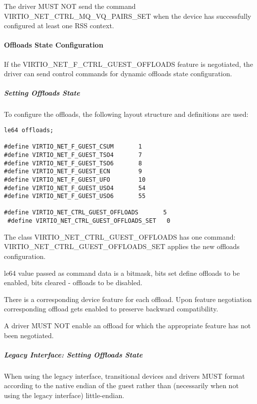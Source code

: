 The driver MUST NOT send the command VIRTIO_NET_CTRL_MQ_VQ_PAIRS_SET when the device has successfully configured at least one RSS context.

\paragraph{Offloads State Configuration}\label{sec:Device Types / Network Device / Device Operation / Control Virtqueue / Offloads State Configuration}

If the VIRTIO_NET_F_CTRL_GUEST_OFFLOADS feature is negotiated, the driver can
send control commands for dynamic offloads state configuration.

\subparagraph{Setting Offloads State}\label{sec:Device Types / Network Device / Device Operation / Control Virtqueue / Offloads State Configuration / Setting Offloads State}

To configure the offloads, the following layout structure and
definitions are used:

\begin{lstlisting}
le64 offloads;

#define VIRTIO_NET_F_GUEST_CSUM       1
#define VIRTIO_NET_F_GUEST_TSO4       7
#define VIRTIO_NET_F_GUEST_TSO6       8
#define VIRTIO_NET_F_GUEST_ECN        9
#define VIRTIO_NET_F_GUEST_UFO        10
#define VIRTIO_NET_F_GUEST_USO4       54
#define VIRTIO_NET_F_GUEST_USO6       55

#define VIRTIO_NET_CTRL_GUEST_OFFLOADS       5
 #define VIRTIO_NET_CTRL_GUEST_OFFLOADS_SET   0
\end{lstlisting}

The class VIRTIO_NET_CTRL_GUEST_OFFLOADS has one command:
VIRTIO_NET_CTRL_GUEST_OFFLOADS_SET applies the new offloads configuration.

le64 value passed as command data is a bitmask, bits set define
offloads to be enabled, bits cleared - offloads to be disabled.

There is a corresponding device feature for each offload. Upon feature
negotiation corresponding offload gets enabled to preserve backward
compatibility.


A driver MUST NOT enable an offload for which the appropriate feature
has not been negotiated.

\subparagraph{Legacy Interface: Setting Offloads State}\label{sec:Device Types / Network Device / Device Operation / Control Virtqueue / Offloads State Configuration / Setting Offloads State / Legacy Interface: Setting Offloads State}
When using the legacy interface, transitional devices and drivers
MUST format 
according to the native endian of the guest rather than
(necessarily when not using the legacy interface) little-endian.


